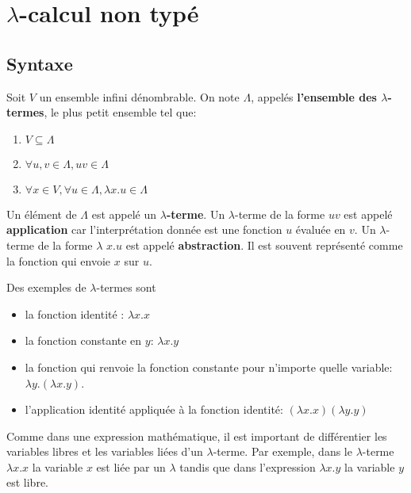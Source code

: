 \chapter{$\lambda$-calcul non typé}

\section{Syntaxe}

\begin{definition} 
  Soit $V$ un ensemble infini dénombrable. On note $\Lambda$, appelés \textbf{l'ensemble des $\lambda$-termes}, le plus petit
  ensemble tel que:
  \begin{enumerate}
    \item $V \subseteq \Lambda$
    \item $\forall u, v \in \Lambda, uv \in \Lambda$
    \item $\forall x \in V, \forall u \in \Lambda, \lambda x.u \in \Lambda$
  \end{enumerate}

\end{definition}

Un élément de $\Lambda$ est appelé un \textbf{$\lambda$-terme}.
Un $\lambda$-terme de la forme $uv$ est appelé \textbf{application} car
l'interprétation donnée est une fonction $u$ évaluée en $v$.
Un $\lambda$-terme de la forme $\lambda$ $x.u$ est appelé
\textbf{abstraction}. Il est souvent représenté comme la fonction qui envoie
$x$ sur $u$.

Des exemples de $\lambda$-termes sont
\begin{itemize}
  \item la fonction identité : $\lambda x . x$
  \item la fonction constante en $y$: $\lambda x . y$
  \item la fonction qui renvoie la fonction constante pour n'importe quelle
    variable: $\lambda y . (\lambda x . y)$.
  \item l'application identité appliquée à la fonction identité: $(\lambda x . x)
    (\lambda y . y)$
\end{itemize}

Comme dans une expression mathématique, il est important de différentier les
variables libres et les variables liées d'un $\lambda$-terme. Par exemple, dans
le $\lambda$-terme $\lambda x . x$ la variable $x$ est liée par un $\lambda$
tandis que dans l'expression $\lambda x . y$ la variable $y$ est libre.

